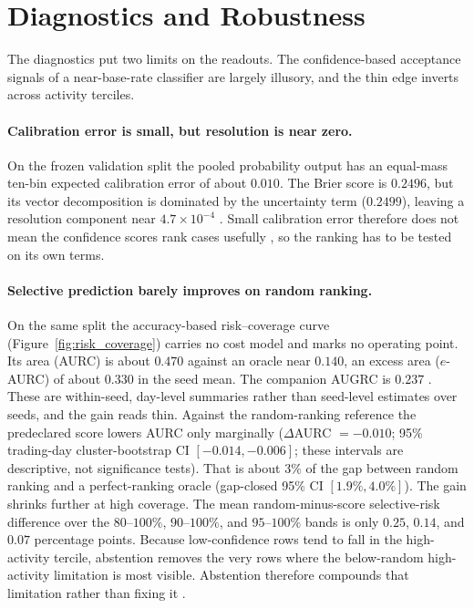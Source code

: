 \section{Diagnostics and Robustness}
\label{sec:diagnostics}

The diagnostics put two limits on the readouts. The confidence-based acceptance
signals of a near-base-rate classifier are largely illusory, and the thin edge
inverts across activity terciles.

\paragraph{Calibration error is small, but resolution is near zero.}
On the frozen validation split the pooled probability output has an equal-mass
ten-bin expected calibration error of about $0.010$. The Brier score is $0.2496$,
but its vector decomposition is dominated by the uncertainty term ($0.2499$),
leaving a resolution component near $4.7\times10^{-4}$
\cite{brier1950verification,murphy1973vector}. Small calibration error therefore
does not mean the confidence scores rank cases usefully
\cite{guo2017calibration}, so the ranking has to be tested on its own terms.

\paragraph{Selective prediction barely improves on random ranking.}
On the same split the accuracy-based risk--coverage curve
(Figure~\ref{fig:risk_coverage}) carries no cost model and marks no operating
point. Its area (AURC) is about $0.470$ against an oracle near $0.140$, an excess
area ($e$-AURC) of about $0.330$ in the seed mean. The companion AUGRC is $0.237$
\cite{geifman2017selective,geifman2019selectivenet,elyaniv2010foundations,traub2024overcoming}. These are within-seed,
day-level summaries rather than seed-level estimates over \numseeds{} seeds, and
the gain reads thin. Against the random-ranking reference the predeclared score
lowers AURC only marginally ($\Delta$AURC $=-0.010$; 95\% trading-day
cluster-bootstrap CI $[-0.014,-0.006]$; these intervals are descriptive, not significance tests). That is about $3\%$ of the gap between
random ranking and a perfect-ranking oracle (gap-closed 95\% CI $[1.9\%,4.0\%]$).
The gain shrinks further at high coverage. The mean random-minus-score
selective-risk difference over the $80$--$100\%$, $90$--$100\%$, and $95$--$100\%$
bands is only $0.25$, $0.14$, and $0.07$ percentage points.
Because low-confidence rows tend to fall in the high-activity tercile, abstention
removes the very rows where the below-random high-activity limitation is most
visible. Abstention therefore compounds that limitation rather than fixing it
\cite{chalkidis2021trading}.

